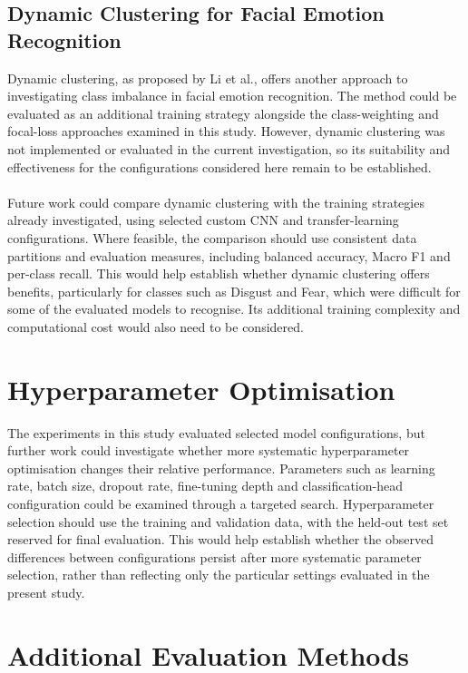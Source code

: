 \documentclass[12pt, a4paper]{report}
\let\oldsection\section
\renewcommand{\section}{%
    \Needspace{6\baselineskip}%
    \oldsection
}
\let\oldsubsection\subsection
\renewcommand{\subsection}{%
    \Needspace{6\baselineskip}%
    \oldsubsection
}
\begin{document}
			\subsection{Dynamic Clustering for Facial Emotion Recognition}
				
				Dynamic clustering, as proposed by Li et al.\cite{Li2025DynamicClusteringFER}, offers another approach to investigating class imbalance in facial emotion recognition. The method could be evaluated as an additional training strategy alongside the class-weighting and focal-loss approaches examined in this study. However, dynamic clustering was not implemented or evaluated in the current investigation, so its suitability and effectiveness for the configurations considered here remain to be established.\\\\
			Future work could compare dynamic clustering with the training strategies already investigated, using selected custom CNN and transfer-learning configurations. Where feasible, the comparison should use consistent data partitions and evaluation measures, including balanced accuracy, Macro F1 and per-class recall. This would help establish whether dynamic clustering offers benefits, particularly for classes such as Disgust and Fear, which were difficult for some of the evaluated models to recognise. Its additional training complexity and computational cost would also need to be considered.
				
		\section{Hyperparameter Optimisation}
			
			The experiments in this study evaluated selected model configurations, but further work could investigate whether more systematic hyperparameter optimisation changes their relative performance. Parameters such as learning rate, batch size, dropout rate, fine-tuning depth and classification-head configuration could be examined through a targeted search. Hyperparameter selection should use the training and validation data, with the held-out test set reserved for final evaluation. This would help establish whether the observed differences between configurations persist after more systematic parameter selection, rather than reflecting only the particular settings evaluated in the present study.
			
		\section{Additional Evaluation Methods}
			
\end{document}
